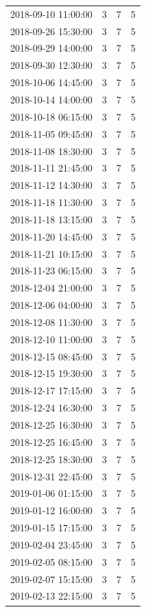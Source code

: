 \begin{tabular}{lrrr}
2018-09-10 11:00:00 & 3 & 7 & 5 \\
2018-09-26 15:30:00 & 3 & 7 & 5 \\
2018-09-29 14:00:00 & 3 & 7 & 5 \\
2018-09-30 12:30:00 & 3 & 7 & 5 \\
2018-10-06 14:45:00 & 3 & 7 & 5 \\
2018-10-14 14:00:00 & 3 & 7 & 5 \\
2018-10-18 06:15:00 & 3 & 7 & 5 \\
2018-11-05 09:45:00 & 3 & 7 & 5 \\
2018-11-08 18:30:00 & 3 & 7 & 5 \\
2018-11-11 21:45:00 & 3 & 7 & 5 \\
2018-11-12 14:30:00 & 3 & 7 & 5 \\
2018-11-18 11:30:00 & 3 & 7 & 5 \\
2018-11-18 13:15:00 & 3 & 7 & 5 \\
2018-11-20 14:45:00 & 3 & 7 & 5 \\
2018-11-21 10:15:00 & 3 & 7 & 5 \\
2018-11-23 06:15:00 & 3 & 7 & 5 \\
2018-12-04 21:00:00 & 3 & 7 & 5 \\
2018-12-06 04:00:00 & 3 & 7 & 5 \\
2018-12-08 11:30:00 & 3 & 7 & 5 \\
2018-12-10 11:00:00 & 3 & 7 & 5 \\
2018-12-15 08:45:00 & 3 & 7 & 5 \\
2018-12-15 19:30:00 & 3 & 7 & 5 \\
2018-12-17 17:15:00 & 3 & 7 & 5 \\
2018-12-24 16:30:00 & 3 & 7 & 5 \\
2018-12-25 16:30:00 & 3 & 7 & 5 \\
2018-12-25 16:45:00 & 3 & 7 & 5 \\
2018-12-25 18:30:00 & 3 & 7 & 5 \\
2018-12-31 22:45:00 & 3 & 7 & 5 \\
2019-01-06 01:15:00 & 3 & 7 & 5 \\
2019-01-12 16:00:00 & 3 & 7 & 5 \\
2019-01-15 17:15:00 & 3 & 7 & 5 \\
2019-02-04 23:45:00 & 3 & 7 & 5 \\
2019-02-05 08:15:00 & 3 & 7 & 5 \\
2019-02-07 15:15:00 & 3 & 7 & 5 \\
2019-02-13 22:15:00 & 3 & 7 & 5 \\

\end{tabular}
